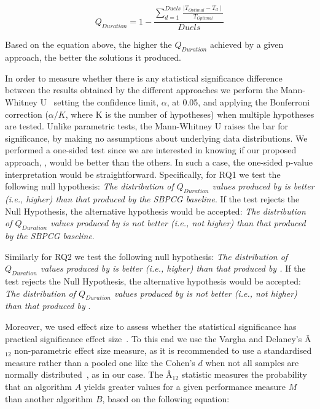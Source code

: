 \begin{equation}
    Q_{Duration} =  1 - \frac{\sum\limits_{d=1}^{Duels}\frac{\mid T_{Optimal} - T_{d} \mid}{T_{Optimal}}}{Duels} 
\end{equation}

Based on the equation above, the higher the $Q_{Duration}$ achieved by a given approach, the better the solutions it produced.

In order to measure whether there is any statistical significance difference between the results obtained by the different approaches we perform the Mann-Whitney U~\cite{mann1947test} setting the confidence limit, $\alpha$, at 0.05, and applying the Bonferroni correction ($\alpha/K$, where K is the number of hypotheses) when multiple hypotheses are tested.  
Unlike parametric tests, the Mann-Whitney U raises the bar for significance, by making no assumptions about underlying data distributions. We performed a one-sided test since we are interested in knowing if our proposed approach, \simhotep{}, would be better than the others. In such a case, the one-sided p-value interpretation would be straightforward. Specifically, for RQ1 we test the following null hypothesis: \textit{The distribution of $Q_{Duration}$ values produced by  \simhotep{}  is better (i.e., higher) than that produced by the SBPCG baseline}.
If the test rejects the Null Hypothesis, the alternative hypothesis would be accepted: \textit{The distribution of $Q_{Duration}$ values produced by \simhotep{} is not better (i.e., not higher) than that produced by the SBPCG baseline}.

Similarly for RQ2 we test the following null hypothesis: \textit{The distribution of $Q_{Duration}$ values produced by  \simhotep{}  is better (i.e., higher) than that produced by \timhotep{}.}
If the test rejects the Null Hypothesis, the alternative hypothesis would be accepted:
\textit{The distribution of $Q_{Duration}$ values produced by \simhotep{}  is not better (i.e., not higher) than that produced by \timhotep{}}.

Moreover, we used effect size to assess whether the statistical significance has practical significance effect size~\cite{Arcuri2014}. To this end we use the Vargha and Delaney's Â$_{12}$ non-parametric effect size measure, as it is recommended to use a standardised measure rather than a pooled one like the Cohen's $d$ when not all samples are normally distributed~\cite{Arcuri2014}, as in our case. 
The Â$_{12}$ statistic measures the probability that an algorithm $A$ yields greater values for a given performance measure $M$ than another algorithm $B$, based on the following equation: 

